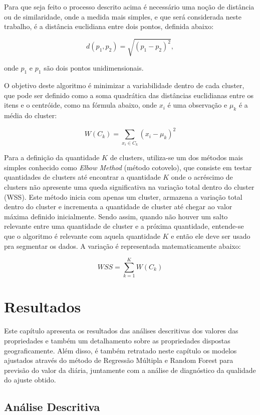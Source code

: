 \documentclass[
	12pt,				%
	a4paper,		%
	oneside,    %
	chapter=TITLE,		   %
	section=TITLE,		   %
	subsection=TITLE,	   %
	subsubsection=TITLE, %
	english,			%
	french,				%
	spanish,			%
	brazil,				%
]{abntex2}
\begin{document}
Para que seja feito o processo descrito acima é necessário uma noção de
distância ou de similaridade, onde a medida mais simples, e que será
considerada neste trabalho, é a distância euclidiana entre dois pontos,
definida abaixo:

\[
d(p_1,p_2) = \sqrt{(p_1 - p_2)^2},
\]

\noindent onde \(p_1\) e \(p_1\) são dois pontos unidimensionais.

O objetivo deste algoritmo é minimizar a variabilidade dentro de cada
cluster, que pode ser definido como a soma quadrática das distâncias
euclidianas entre os itens e o centróide, como na fórmula abaixo, onde
\(x_i\) é uma observação e \(\mu_k\) é a média do cluster:

\[
W(C_k) = \sum_{x_i \in C_k}(x_i-\mu_k)^2 
\]

Para a definição da quantidade \(K\) de clusters, utiliza-se um dos
métodos mais simples conhecido como \emph{Elbow Method} (método
cotovelo), que consiste em testar quantidades de clusters até encontrar
a quantidade \(K\) onde o acréscimo de clusters não apresente uma queda
significativa na variação total dentro do cluster (WSS). Este método
inicia com apenas um cluster, armazena a variação total dentro do
cluster e incrementa a quantidade de cluster até chegar ao valor máxima
definido inicialmente. Sendo assim, quando não houver um salto relevante
entre uma quantidade de cluster e a próxima quantidade, entende-se que o
algoritmo é relevante com aquela quantidade \(K\) e então ele deve ser
usado pra segmentar os dados. A variação é representada matematicamente
abaixo:

\[
WSS = \sum_{k=1}^K W(C_k)
\]

\hypertarget{resultados}{%
\chapter{Resultados}\label{resultados}}

Este capítulo apresenta os resultados das análises descritivas dos
valores das propriedades e também um detalhamento sobre as propriedades
dispostas geograficamente. Além disso, é também retratado neste capítulo
os modelos ajustados através do método de Regressão Múltipla e Random
Forest para previsão do valor da diária, juntamente com a análise de
diagnóstico da qualidade do ajuste obtido.

\hypertarget{anuxe1lise-descritiva}{%
\section{Análise Descritiva}\label{anuxe1lise-descritiva}}
\end{document}
